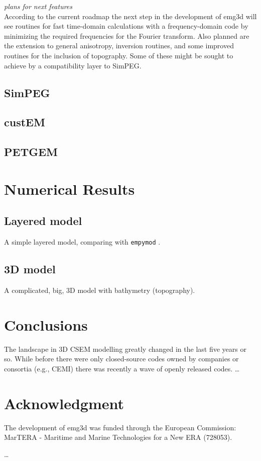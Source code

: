 \documentclass[paper,twocolumn,twoside]{geophysics}
\begin{document}
\emph{plans for next features}\\
According to the current roadmap the next step in the development of emg3d will
see routines for fast time-domain calculations with a frequency-domain code by
minimizing the required frequencies for the Fourier transform. Also planned are
the extension to general anisotropy, inversion routines, and some improved
routines for the inclusion of topography. Some of these might be sought to
achieve by a compatibility layer to SimPEG.

\subsection{SimPEG}

\subsection{custEM}

\subsection{PETGEM}

\section{Numerical Results}

\subsection{Layered model}

A simple layered model, comparing with \texttt{empymod}
\citep{GEO.17.Werthmuller}.

\subsection{3D model}

A complicated, big, 3D model with bathymetry (topography).

\section{Conclusions}

The landscape in 3D CSEM modelling greatly changed in the last five years or
so. While before there were only closed-source codes owned by companies or
consortia (e.g., CEMI) there was recently a wave of openly released codes.
\dots

\section{Acknowledgment}

The development of emg3d was funded through the European Commission: MarTERA -
Maritime and Marine Technologies for a New ERA (728053).

\dots





\end{document}
